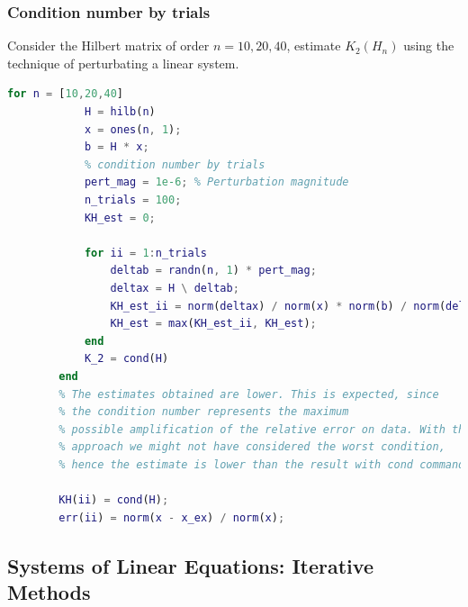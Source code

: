     \subsubsection{Condition number by trials}
        Consider the Hilbert matrix of order $n=10,20,40$, estimate $K_2(H_n)$ using the technique of perturbating a linear system. 
        \begin{lstlisting}[language=Matlab, escapeinside=`', gobble=8]
        for n = [10,20,40]
            H = hilb(n)
            x = ones(n, 1);
            b = H * x;
            % condition number by trials
            pert_mag = 1e-6; % Perturbation magnitude
            n_trials = 100;
            KH_est = 0;
        
            for ii = 1:n_trials
                deltab = randn(n, 1) * pert_mag;
                deltax = H \ deltab;
                KH_est_ii = norm(deltax) / norm(x) * norm(b) / norm(deltab);
                KH_est = max(KH_est_ii, KH_est);
            end
            K_2 = cond(H)
        end
        % The estimates obtained are lower. This is expected, since
        % the condition number represents the maximum 
        % possible amplification of the relative error on data. With the first
        % approach we might not have considered the worst condition, 
        % hence the estimate is lower than the result with cond command.

        KH(ii) = cond(H);
        err(ii) = norm(x - x_ex) / norm(x);
        \end{lstlisting}
    
\subsection{Systems of Linear Equations: Iterative Methods}
